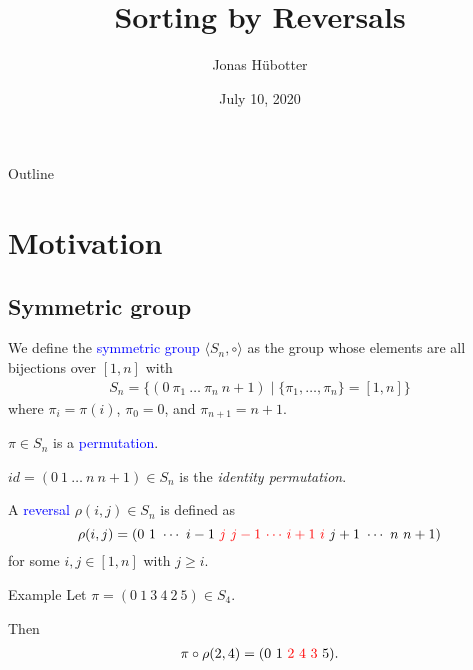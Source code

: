 \documentclass{beamer}
\title[Sorting by Reversals]{Sorting by Reversals}
\author{Jonas Hübotter}
\date{July 10, 2020}
\theoremstyle{definition}
\def\spadding{\vspace{0.25cm}}
\def\b{\textcolor{blue}}
\def\r{\textcolor{red}}
\begin{document}
\begin{frame}
  \titlepage
\end{frame}

\begin{frame}{Outline}
 \tableofcontents
\end{frame}

\section{Motivation}

\subsection{Symmetric group}

\begin{frame}

\begin{definition}
We define the \b{symmetric group} $\langle S_n, \circ \rangle$ as the group whose elements are all bijections over $[1,n]$ \pause with
\begin{align*}
    S_n = \{(0\ \pi_1\ \dots\ \pi_n\ n+1) \mid \{\pi_1, \dots, \pi_n\} = [1,n]\}
\end{align*}
where $\pi_i = \pi(i)$, $\pi_0 = 0$, and $\pi_{n+1} = n+1$.\pause\spadding

$\pi \in S_n$ is a \b{permutation}.\pause\spadding

$id = (0\ 1\ \dots\ n\ n+1) \in S_n$ is the \textit{identity permutation}.
\end{definition}

\end{frame}

\begin{frame}

\begin{definition}
A \b{reversal} $\rho(i,j) \in S_n$ is defined as
\[
    \rho(i,j) = (0\ 1\ \cdots\ i-1\ \r j\ \r{j-1}\ \r \cdots\ \r{i+1}\ \r i\ j+1\ \cdots\ n\ n+1)
\]
for some $i, j \in [1, n]$ with $j \geq i$.
\end{definition}\pause

\begin{exampleblock}{Example}
Let $\pi = (0\ 1\ 3\ 4\ 2\ 5) \in S_4$. \par
Then
\begin{align*}
    \pi \circ \rho(2,4) = (0\ 1\ \r{2\ 4\ 3}\ 5).
\end{align*}
\end{exampleblock}

\end{frame}
\end{document}
